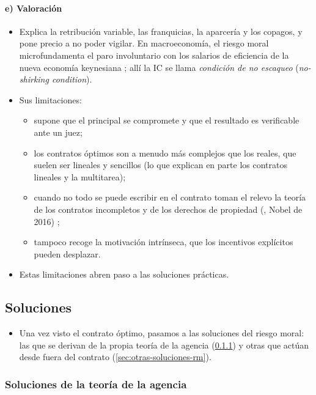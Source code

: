\documentclass[11pt]{article}
\begin{document}
\paragraph{e) Valoración}

\begin{itemize}
\item Explica la retribución variable, las franquicias, la aparcería y los copagos, y pone precio a no poder vigilar. En macroeconomía, el riesgo moral microfundamenta el paro involuntario con los salarios de eficiencia de la nueva economía keynesiana  ; allí la IC se llama \emph{condición de no escaqueo} (\emph{no-shirking condition}).
\item Sus limitaciones:
  \begin{itemize}
  \item supone que el principal se compromete y que el resultado es verificable ante un juez;
  \item los contratos óptimos son a menudo más complejos que los reales, que suelen ser lineales y sencillos (lo que explican en parte los contratos lineales y la multitarea);
  \item cuando no todo se puede escribir en el contrato toman el relevo la teoría de los contratos incompletos y de los derechos de propiedad (, Nobel de 2016)\nocite{Nobel2016HartHolmstrom} ;
  \item tampoco recoge la motivación intrínseca, que los incentivos explícitos pueden desplazar.
  \end{itemize}
\item Estas limitaciones abren paso a las soluciones prácticas.
\end{itemize}

\subsection{Soluciones}\label{sec:soluciones-rm}

\begin{itemize}
\item Una vez visto el contrato óptimo, pasamos a las soluciones del riesgo moral: las que se derivan de la propia teoría de la agencia (\ref{sec:soluciones-agencia}) y otras que actúan desde fuera del contrato (\ref{sec:otras-soluciones-rm}).
\end{itemize}

\subsubsection{Soluciones de la teoría de la agencia}\label{sec:soluciones-agencia}
\end{document}
